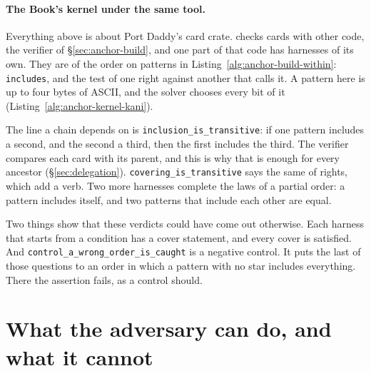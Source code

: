 \documentclass[11pt,a4paper]{article}
\theoremstyle{definition}
\begin{document}
\paragraph{The Book's kernel under the same tool.}
Everything above is about Port Daddy's card crate. \pdkernelname{} checks
cards with other code, the verifier of \S\ref{sec:anchor-build}, and one
part of that code has harnesses of its own. They are of the order on
patterns in Listing~\ref{alg:anchor-build-within}: \texttt{includes}, and
the test of one right against another that calls it. A pattern here is up
to four bytes of ASCII, and the solver chooses every bit of it
(Listing~\ref{alg:anchor-kernel-kani}).


The line a chain depends on is \texttt{inclusion\_is\_transitive}: if one
pattern includes a second, and the second a third, then the first includes
the third. The verifier compares each card with its parent, and
this is why that is enough for every ancestor
(\S\ref{sec:delegation}). \texttt{covering\_is\_transitive} says the same
of rights, which add a verb. Two more harnesses complete the laws of a
partial order: a pattern includes itself, and two patterns that include each
other are equal.

Two things show that these verdicts could have come out otherwise. Each
harness that starts from a condition has a cover statement, and every
cover is satisfied. And \texttt{control\_a\_wrong\_order\_is\_caught} is a
negative control. It puts the last of those questions to an order in which a
pattern with no star includes everything. There the assertion fails, as a
control should.

\pdexercisepointer{\ref{ex:anchor-kani-scope}}{\ref{ex:anchor-model-vs-code}}{\pageref{ex:anchor-kani-scope}}

\section{What the adversary can do, and what it cannot}\label{sec:adversary}
\end{document}
